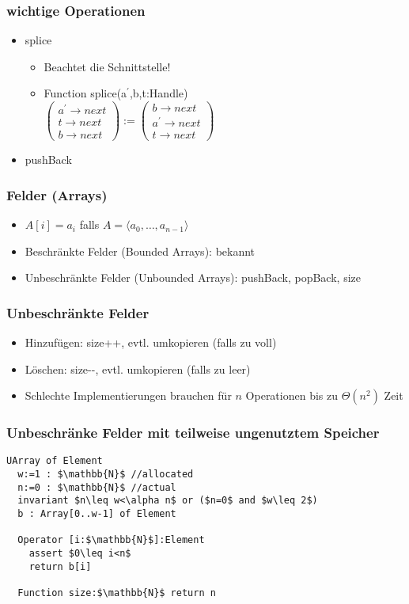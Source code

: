 \begin{frame}[fragile]
\frametitle{wichtige Operationen}
\begin{itemize}
\item splice
\begin{itemize}
\item Beachtet die Schnittstelle!
\item Function splice(a$^\prime$,b,t:Handle)\\ $\begin{pmatrix}a^\prime\to next\\t\to next\\b\to next\end{pmatrix}:=\begin{pmatrix}b\to next\\a^\prime\to next\\t\to next\end{pmatrix}$
\end{itemize}\pause
\item pushBack
\end{itemize}
\end{frame}

\begin{frame}
\frametitle{Felder (Arrays)}
\begin{itemize}
\item $A[i]=a_i$ falls $A=\langle a_0,\ldots,a_{n-1}\rangle$
\item Beschränkte Felder (Bounded Arrays): bekannt
\item Unbeschränkte Felder (Unbounded Arrays): pushBack, popBack, size
\end{itemize}
\end{frame}

\begin{frame}
\frametitle{Unbeschränkte Felder}
\begin{itemize}
\item Hinzufügen: size++, evtl. umkopieren (falls zu voll)
\item Löschen: size-{}-, evtl. umkopieren (falls zu leer)
\item Schlechte Implementierungen brauchen für $n$ Operationen bis zu $\Theta(n^2)$ Zeit
\end{itemize}
\end{frame}

\begin{frame}[fragile]
\frametitle{Unbeschränke Felder mit teilweise ungenutztem Speicher}
\begin{lstlisting}
UArray of Element
  w:=1 : $\mathbb{N}$ //allocated
  n:=0 : $\mathbb{N}$ //actual
  invariant $n\leq w<\alpha n$ or ($n=0$ and $w\leq 2$)
  b : Array[0..w-1] of Element
  
  Operator [i:$\mathbb{N}$]:Element
    assert $0\leq i<n$
    return b[i]
  
  Function size:$\mathbb{N}$ return n
\end{lstlisting}
\end{frame}


